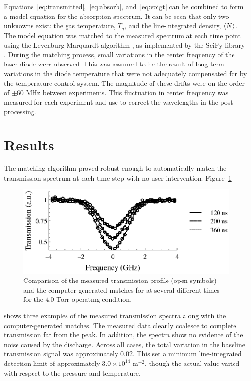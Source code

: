 Equations~\ref{eq:transmitted},~\ref{eq:absorb}, and~\ref{eq:voigt} can be
combined to form a model equation for the absorption spectrum. It can be seen
that only two unknowns exist: the gas temperature, $T_g$, and the
line-integrated density, $\langle N \rangle$. The model equation was matched to the measured
spectrum at each time point using the Levenburg-Marquardt algorithm
\cite{Marquardt1963}, as implemented by the SciPy library \cite{Jones2001}.
During the matching process, small variations in the center frequency of the
laser diode were observed. This was assumed to be the result of long-term
variations in the diode temperature that were not adequately compensated for by
the temperature control system. The magnitude of these drifts were on the order
of $\pm60$ MHz between experiments. This fluctuation in center frequency was
measured for each experiment and use to correct the wavelengths in the
post-processing.

\section{Results}

The matching algorithm proved robust enough to automatically match the
transmission spectrum at each time step with no user intervention.
Figure~\ref{fig:matching}
\begin{figure}
  \centering
  \includegraphics{./chapters/metastables/figures/matching.eps}
  \caption{Comparison of the measured transmission profile (open symbols) and
  the computer-generated matches for at several different times for the 4.0 Torr
  operating condition.}
  \label{fig:matching}
\end{figure}
shows three examples of the measured transmission spectra along with the
computer-generated matches. The measured data cleanly coalesce to complete
transmission far from the peak. In addition, the spectra show no evidence of the
noise caused by the discharge. Across all cases, the total variation in the
baseline transmission signal was approximately 0.02. This set a minimum
line-integrated detection limit of approximately $3.0 \times 10^{14}$ m$^{-2}$,
though the actual value varied with respect to the pressure and temperature.

